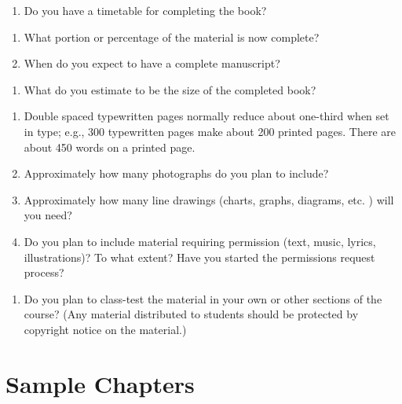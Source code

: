 \documentclass[
  10pt,
  dvipsnames,enabledeprecatedfontcommands]{scrartcl}
\providecommand{\tightlist}{%
  \setlength{\itemsep}{0pt}\setlength{\parskip}{0pt}}
\begin{document}
\begin{enumerate}
\def\labelenumi{\arabic{enumi}.}
\tightlist
\item
  Do you have a timetable for completing the book?
\end{enumerate}

\begin{enumerate}
\def\labelenumi{\alph{enumi}.}
\item
  What portion or percentage of the material is now complete?
\item
  When do you expect to have a complete manuscript?
\end{enumerate}

\begin{enumerate}
\def\labelenumi{\arabic{enumi}.}
\setcounter{enumi}{1}
\tightlist
\item
  What do you estimate to be the size of the completed book?
\end{enumerate}

\begin{enumerate}
\def\labelenumi{\alph{enumi}.}
\item
  Double spaced typewritten pages normally reduce about one-third when
  set in type; e.g., 300 typewritten pages make about 200 printed pages.
  There are about 450 words on a printed page.
\item
  Approximately how many photographs do you plan to include?
\item
  Approximately how many line drawings (charts, graphs, diagrams, etc. )
  will you need?
\item
  Do you plan to include material requiring permission (text, music,
  lyrics, illustrations)? To what extent? Have you started the
  permissions request process?
\end{enumerate}

\begin{enumerate}
\def\labelenumi{\arabic{enumi}.}
\setcounter{enumi}{2}
\tightlist
\item
  Do you plan to class-test the material in your own or other sections
  of the course? (Any material distributed to students should be
  protected by copyright notice on the material.)
\end{enumerate}

\hypertarget{sample-chapters}{%
\section{Sample Chapters}\label{sample-chapters}}
\end{document}
